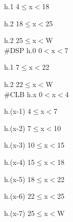 \documentclass[11pt]{article}
\theoremstyle{definition}
\begin{document}
   					  \hspace{48mm} h.1 \hspace{10mm}  4$\leq$x$<$18
   					  
   					  \hspace{48mm} h.2 \hspace{10mm}  18$\leq$x$<$25
   					  
   					  \hspace{48mm} h.2 \hspace{10mm}  25$\leq$x$<$W  \\
   					  

\hspace{15mm} \#DSP  \hspace{20mm} h.0 \hspace{10mm}  0$<$x$<$7

					  \hspace{49mm} h.1 \hspace{10mm}  7$\leq$x$<$22
					  
					  \hspace{49mm} h.2 \hspace{10mm} 22$\leq$x$<$W   \\
					  

\hspace{15mm} \#CLB  \hspace{20mm} h.x \hspace{15mm}     0$<$x$<$4
					  				  
					  \hspace{48mm} h.(x-1) \hspace{10mm} 4$\leq$x$<$7
					  
					  \hspace{48mm} h.(x-2) \hspace{10mm} 7$\leq$x$<$10
					  
					  \hspace{48mm} h.(x-3) \hspace{10mm} 10$\leq$x$<$15
					  
					  \hspace{48mm} h.(x-4) \hspace{10mm} 15$\leq$x$<$18
					  
					  \hspace{48mm} h.(x-5) \hspace{10mm} 18$\leq$x$<$22
					  
					  \hspace{48mm} h.(x-6) \hspace{10mm} 22$\leq$x$<$25
					  
					  \hspace{48mm} h.(x-7) \hspace{10mm} 25$\leq$x$<$W
					  
\end{document}
